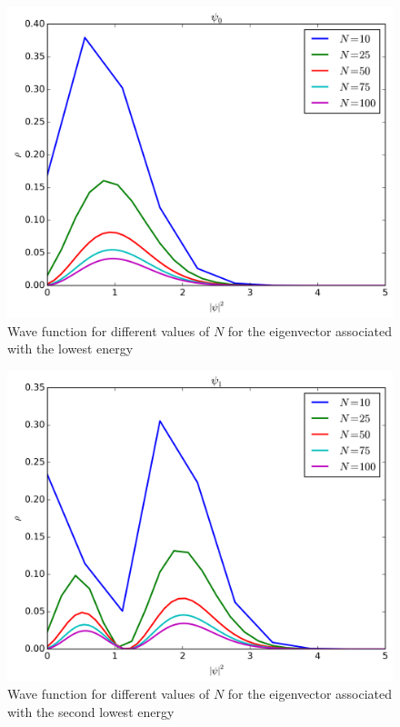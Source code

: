 \documentclass[11pt,a4paper,english,draft]{article}
\numberwithin{equation}{section}
\newcommand{\figurewidth}{.85\textwidth}
\begin{document}
\begin{figure}
\centering
\includegraphics[width=\figurewidth]{../results/N_compare_psi0.png}
\caption{Wave function for different values of $N$ for
the eigenvector associated with the lowest energy}
\label{fig:psi0N}
\end{figure}

\begin{figure}
\centering
\includegraphics[width=\figurewidth]{../results/N_compare_psi1.png}
\caption{Wave function for different values of $N$ for
the eigenvector associated with the second lowest energy}
\label{fig:psi1N}
\end{figure}
\end{document}
